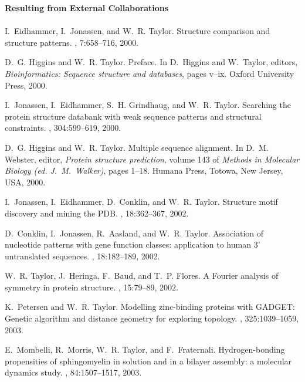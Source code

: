 \begin{thebibliography}{100}

{\bf Resulting from External Collaborations}\\ \\


I.~Eidhammer, I.~Jonassen, and W.~R. Taylor.
\newblock Structure comparison and structure patterns.
, 7:658--716, 2000.

D.~G. Higgins and W.~R. Taylor.
\newblock Preface.
\newblock In D.~Higgins and W.~Taylor, editors, {\em Bioinformatics: Sequence
  structure and databases}, pages v--ix. Oxford University Press, 2000.

I.~Jonassen, I.~Eidhammer, S.~H. Grindhaug, and W.~R. Taylor.
\newblock Searching the protein structure databank with weak sequence patterns
  and structural constraints.
, 304:599--619, 2000.

D.~G. Higgins and W.~R. Taylor.
\newblock Multiple sequence alignment.
\newblock In D.~M. Webster, editor, {\em Protein structure prediction}, volume
  143 of {\em Methods in Molecular Biology (ed. J.~M.~Walker)}, pages 1--18.
  Humana Press, Totowa, New Jersey, USA, 2000.

I.~Jonassen, I.~Eidhammer, D.~Conklin, and W.~R. Taylor.
\newblock Structure motif discovery and mining the {PDB}.
, 18:362--367, 2002.

D.~Conklin, I.~Jonassen, R.~Aasland, and W.~R. Taylor.
\newblock Association of nucleotide patterns with gene function classes:
  application to human 3' untranslated sequences.
, 18:182--189, 2002.

W.~R. Taylor, J.~Heringa, F.~Baud, and T.~P. Flores.
\newblock A {Fourier} analysis of symmetry in protein structure.
, 15:79--89, 2002.

K.~Petersen and W.~R. Taylor.
\newblock Modelling zinc-binding proteins with {GADGET}: Genetic algorithm and
  distance geometry for exploring topology.
, 325:1039--1059, 2003.

E.~Mombelli, R.~Morris, W.~R. Taylor, and F.~Fraternali.
\newblock Hydrogen-bonding propensities of sphingomyelin in solution and in a
  bilayer assembly: a molecular dynamics study.
, 84:1507--1517, 2003.


\end{thebibliography}
